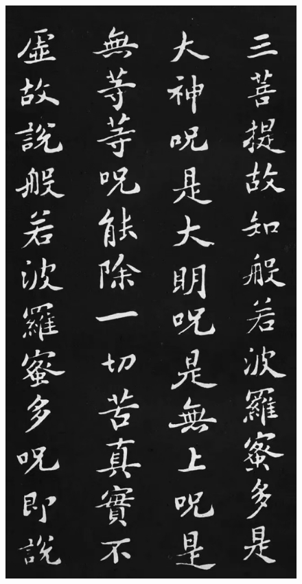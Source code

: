 \documentclass[a4paper,twoside]{article}
\begin{document}
\begin{figure}[ht]
\centering
\includegraphics[width=12.2cm]{images/sushi-5}
\end{figure}
\end{document}
